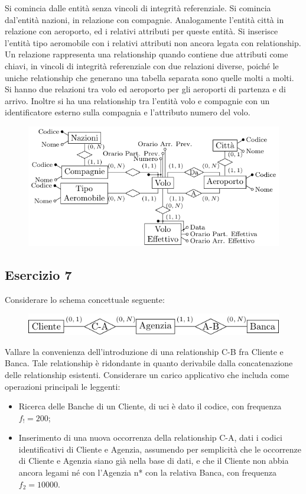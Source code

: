 \documentclass{article}
\numberwithin{equation}{subsection}
\begin{document}
Si comincia dalle entità senza vincoli di integrità referenziale. Si comincia dal'entità nazioni, in relazione con compagnie. Analogamente l'entità 
città in relazione con aeroporto, ed i relativi attributi per queste entità. Si inserisce l'entità tipo aeromobile con i relativi attributi non 
ancora legata con relationship. Un relazione rappresenta una relationship quando contiene due attributi come chiavi, in vincoli di integrità 
referenziale con due relazioni diverse, poiché le uniche relationship che generano una tabella separata sono quelle molti a molti. Si hanno due 
relazioni tra volo ed aeroporto per gli aeroporti di partenza e di arrivo. Inoltre si ha una relationship tra l'entità volo e 
compagnie con un identificatore esterno sulla compagnia e l'attributo numero del volo. 

\begin{figure}[H]%
    \centering%
    \includegraphics[scale=1.25]{schema_voli_25-11-24.pdf}%
\end{figure}

\subsection{Esercizio 7}

Considerare lo schema concettuale seguente:
\begin{figure}[H]%
    \centering
    \includegraphics[scale=1.25]{schema_es_7_25-11-24.pdf}%
\end{figure}

Vallare la convenienza dell'introduzione di una relationship C-B fra Cliente e Banca. Tale relationship è ridondante in quanto derivabile dalla 
concatenazione  delle relationship esistenti. Considerare un carico applicativo che includa come operazioni principali le leggenti:
\begin{itemize}
    \item Ricerca delle Banche di un Cliente, di uci è dato il codice, con frequenza $f_!=200$;
    \item Inserimento di una nuova occorrenza della relationship C-A, dati i codici identificativi di Cliente e Agenzia, assumendo 
    per semplicità che le occorrenze di Cliente e Agenzia siano già nella base di dati, e che il Cliente non 
    abbia ancora legami né con l'Agenzia n* con la relativa Banca, con frequenza $f_2=10000$. 
\end{itemize}
\end{document}
